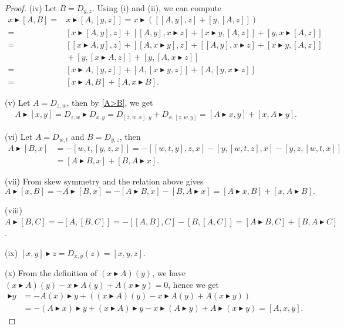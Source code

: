 \documentclass[10pt,a4paper]{amsart}
\numberwithin{equation}{section}
\begin{document}
\begin{proof}
(iv) Let $B=D_{y,z}$. Using (i) and (ii), we can compute
 \begin{align*}
 x \blacktriangleright [A,B] ={}& x \blacktriangleright [A,[y,z]] = x \blacktriangleright ([[A,y],z] + [y,[A,z]] ) \\
 ={}& [x \blacktriangleright [A,y],z] + [[A,y], x \blacktriangleright z] +[x \blacktriangleright y, [A,z]] + [y, x \blacktriangleright [A,z]] \\
 ={}& [[x \blacktriangleright A, y],z] + [[A,x\blacktriangleright y],z] + [[A,y],x \blacktriangleright z] + [x \blacktriangleright y, [A,z]] \\
 &{}+ [y,[x\blacktriangleright A, z]] + [y,[A,x\blacktriangleright z]] \\
 ={}& [x\blacktriangleright A, [y,z]] + [A,[x\blacktriangleright y,z]] + [A,[y,x\blacktriangleright z]] \\
 ={}& [x\blacktriangleright A,B] + [A, x\blacktriangleright B].
 \end{align*}

(v) Let $A= D_{z,w}$, then by \eqref{A>B}, we get
 \begin{align*}
& A \blacktriangleright [x,y] = D_{z,w} \blacktriangleright D_{x,y}
 = D_{[z,w,x],y} + D_{x,[z,w,y]}
 = [A \blacktriangleright x, y] + [x, A \blacktriangleright y].
 \end{align*}

(vi) Let $A = D_{w,t}$ and $B = D_{y,z}$, then
 \begin{align*}
 A\blacktriangleright [B,x] & = - [w,t ,[y,z,x]]
 = -[[w,t,y],z,x] - [y,[w,t,z],x] - [y,z,[w,t,x]] \\
 & = [A \blacktriangleright B,x] + [B, A\blacktriangleright x].
 \end{align*}

(vii) From skew symmetry and the relation above gives \[
 A \blacktriangleright [x,B] = -A \blacktriangleright [B,x] = -[A \blacktriangleright B,x] - [B, A\blacktriangleright x] = [A \blacktriangleright x,B] + [x, A \blacktriangleright B].
 \]

(viii) $ A \blacktriangleright [B,C] = -[A,[B,C]] = -[[A,B],C] - [B,[A,C]] = [A\blacktriangleright B,C] + [B, A\blacktriangleright C]$.

(ix) $[x,y]\blacktriangleright z = D_{x,y} (z) = [x,y,z]$.

(x) From the definition of $(x \blacktriangleright A)(y)$, we have $(x \blacktriangleright A)(y) - x \blacktriangleright A(y) + A(x\blacktriangleright y) = 0$, hence we get
 \begin{align*}
 [A,x] \blacktriangleright y & = -A(x) \blacktriangleright y + ( (x \blacktriangleright A)(y) - x \blacktriangleright A(y) + A(x\blacktriangleright y) ) \\
 & = - (A\blacktriangleright x) \blacktriangleright y + (x \blacktriangleright A) \blacktriangleright y - x \blacktriangleright ( A \blacktriangleright y) + A \blacktriangleright (x \blacktriangleright y)
 = [A,x,y].
 \end{align*}


\end{proof}
\end{document}
